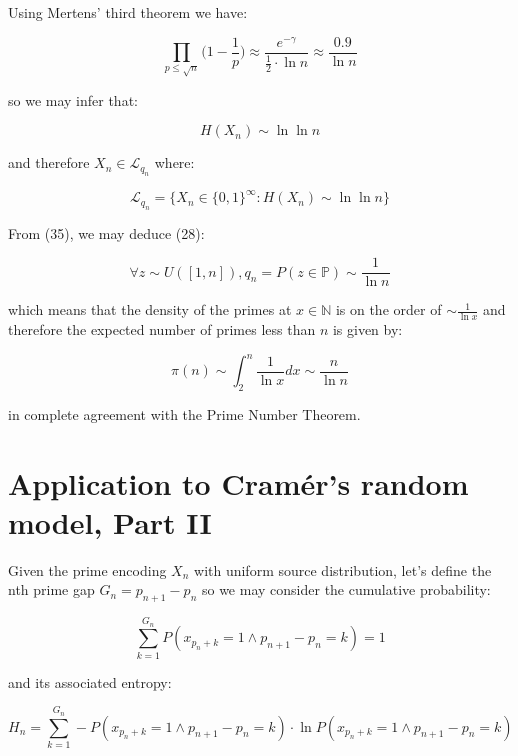 \documentclass{article}
\begin{document}
Using Mertens' third theorem we have:

\begin{equation}
\prod_{p \leq \sqrt{n}} \big(1-\frac{1}{p}\big) \approx \frac{e^{-\gamma}}{\frac{1}{2} \cdot \ln n} \approx \frac{0.9}{\ln n}
\end{equation}

so we may infer that:

\begin{equation}
H(X_n) \sim \ln \ln n
\end{equation}

and therefore $X_n \in \mathcal{L}_{q_n}$ where:

\begin{equation}
\mathcal{L}_{q_n} = \{X_n \in \{0,1\}^{\infty}: H(X_n) \sim \ln\ln n \}
\end{equation}

From (35), we may deduce (28):

\begin{equation}
\forall z \sim U([1,n]), q_n = P(z \in \mathbb{P}) \sim \frac{1}{\ln n}
\end{equation}

which means that the density of the primes at $x \in \mathbb{N}$ is on the order 
of $\sim \frac{1}{\ln x}$ and therefore the expected number of primes less than $n$ is given by: 

\begin{equation}
\pi(n) \sim \int_{2}^n \frac{1}{\ln x} dx \sim \frac{n}{\ln n}
\end{equation}

in complete agreement with the Prime Number Theorem. 

\newpage 

\section{Application to Cramér's random model, Part II}

Given the prime encoding $X_n$ with uniform source distribution, let's define the nth prime gap $G_n=p_{n+1}-p_n$ so we may consider the cumulative probability:

\begin{equation}
\sum_{k=1}^{G_n} P(x_{p_n + k} = 1 \land p_{n+1}-p_n = k) = 1
\end{equation}

and its associated entropy: 

\begin{equation}
H_n = \sum_{k=1}^{G_n} -P(x_{p_n + k} = 1 \land p_{n+1}-p_n = k) \cdot \ln P(x_{p_n + k} = 1 \land p_{n+1}-p_n = k)
\end{equation}
\end{document}
